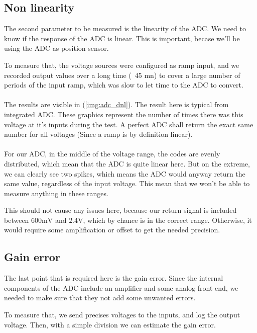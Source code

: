 \FloatBarrier
\subsection{Non linearity}
The second parameter to be measured is the linearity of the ADC. We need to
know if the response of the ADC is linear. This is important, becase we'll be
using the ADC as position sensor.

To measure that, the voltage sources were configured as ramp input, and we
recorded output values over a long time (~45 mn) to cover a large number of
periods of the input ramp, which was slow to let time to the ADC to convert.

\paragraph{}
The results are visible in (\ref{img:adc_dnl}). The result here is typical from
integrated ADC. These graphics represent the number of times there was this
voltage at it's inputs during the test. A perfect ADC shall return the exact
same number for all voltages (Since a ramp is by definition linear).

\paragraph{}
For our ADC, in the middle of the voltage range, the codes are evenly
distributed, which mean that the ADC is quite linear here. But on the extreme,
we can clearly see two spikes, which means the ADC would anyway return the same
value, regardless of the input voltage. This mean that we won't be able to
measure anything in these ranges.

This should not cause any issues here, because our return signal is included
between $600 \si{\milli\volt}$ and $2.4 \si{\volt}$, which by chance is in the
correct range. Otherwise, it would require some amplification or offset to get
the needed precision.

\FloatBarrier
\subsection{Gain error}
The last point that is required here is the gain error. Since the internal
components of the ADC include an amplifier and some analog front-end, we needed
to make sure that they not add some unwanted errors.

To measure that, we send precises voltages to the inputs, and log the output
voltage. Then, with a simple division we can estimate the gain error.

